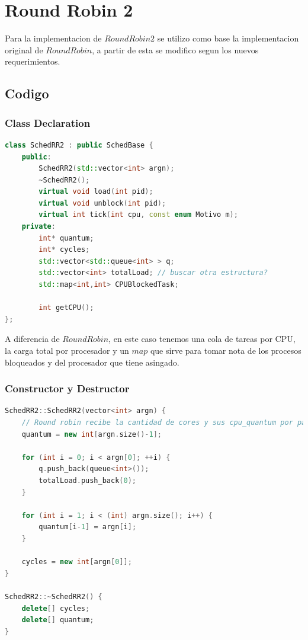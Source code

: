 \section{Round Robin 2}

Para la implementacion de $Round Robin 2$ se utilizo como base la implementacion original de $Round Robin$, a partir de esta se modifico segun los nuevos requerimientos.

\subsection{Codigo}

\subsubsection{Class Declaration}
\begin{lstlisting}[language=C++, breaklines=true]
class SchedRR2 : public SchedBase {
	public:
		SchedRR2(std::vector<int> argn);
        ~SchedRR2();
		virtual void load(int pid);
		virtual void unblock(int pid);
		virtual int tick(int cpu, const enum Motivo m);
	private:
		int* quantum;
		int* cycles;
		std::vector<std::queue<int> > q;
		std::vector<int> totalLoad; // buscar otra estructura?
		std::map<int,int> CPUBlockedTask;

		int getCPU();
};
\end{lstlisting}

A diferencia de $Round Robin$, en este caso tenemos una cola de tareas por CPU, la carga total por procesador y un $map$ que sirve para tomar nota de los procesos bloqueados y del procesador que tiene asingado.

\subsubsection{Constructor y Destructor}
\begin{lstlisting}[language=C++, breaklines=true]
SchedRR2::SchedRR2(vector<int> argn) {
	// Round robin recibe la cantidad de cores y sus cpu_quantum por parametro
	quantum = new int[argn.size()-1];

	for (int i = 0; i < argn[0]; ++i) {
		q.push_back(queue<int>());
		totalLoad.push_back(0);
	}

	for (int i = 1; i < (int) argn.size(); i++) {
		quantum[i-1] = argn[i];
	}

	cycles = new int[argn[0]];
}

SchedRR2::~SchedRR2() {
	delete[] cycles;
	delete[] quantum;
}
\end{lstlisting}

